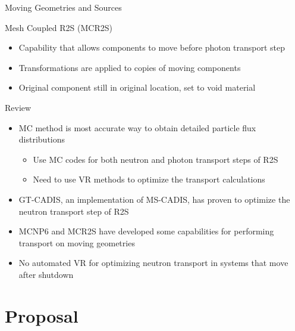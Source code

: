 \documentclass{beamer}
\begin{document}
\begin{frame}{Moving Geometries and Sources}
	\begin{block}{Mesh Coupled R2S (MCR2S)\cite{mcr2s}}
	\begin{itemize}
		\item{Capability that allows components to move before photon
			transport step}
		\item{Transformations are applied to copies of moving
			components}
		\item{Original component still in original location, set to void material}
	\end{itemize}
		\end{block}
\end{frame}

\begin{frame}{Review}
	\begin{itemize}
		\item{MC method is most accurate way to obtain detailed
			particle flux distributions}
			\begin{itemize}
          	  	  \item{Use MC codes for both neutron and photon transport steps
          	  	  	of R2S}
          	  	  \item{Need to use VR methods to optimize the transport
          	  	  	calculations}
          		\end{itemize}
		\item{GT-CADIS, an implementation of MS-CADIS,  has proven to optimize the neutron transport
			step of R2S}
		\item{MCNP6 and MCR2S have developed some capabilities for
			performing transport on moving geometries}
		\item{No automated VR for optimizing neutron transport
			in systems that move after shutdown}
	\end{itemize}

\end{frame}



\section{Proposal}
\end{document}
